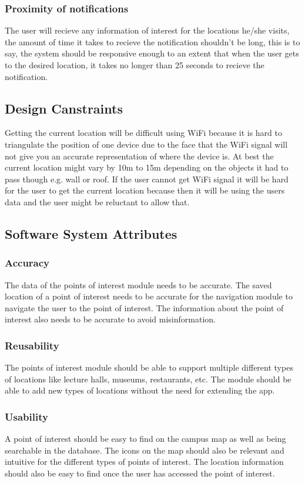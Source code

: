 \subsubsection{Proximity of notifications}
The user will recieve any information of interest for the locations he/she visits, the amount of time it takes to recieve the notification shouldn't be long, this is to say, the system should be responsive enough to an extent that when the user gets to the desired location, it takes no longer than 25 seconds to recieve the notification.
  	
 \subsection{Design Canstraints}
 Getting the current location will be difficult using WiFi because it is hard to triangulate the position of one device due to the face that the WiFi signal will not give you an accurate representation of where the device is. At best the current location might vary by 10m to 15m depending on the objects it had to pass though e.g. wall or roof. If the user cannot get WiFi signal it will be hard for the user to get the current location because then it will be using the users data and the user might be reluctant to allow that. 	
  	
\subsection{Software System Attributes}
    \subsubsection{Accuracy}
        The data of the points of interest module needs to be accurate. The saved location of a point of interest needs to be accurate for the navigation module to navigate the user to the point of interest. The information about the point of interest also needs to be accurate to avoid misinformation.
    \subsubsection{Reusability}
        The points of interest module should be able to support multiple different types of locations like lecture halls, museums, restaurants, etc. The module should be able to add new types of locations without the need for extending the app.
    \subsubsection{Usability}
        A point of interest should be easy to find on the campus map as well as being searchable in the database. The icons on the map should also be relevant and intuitive for the different types of points of interest. The location information should also be easy to find once the user has accessed the point of interest. 
